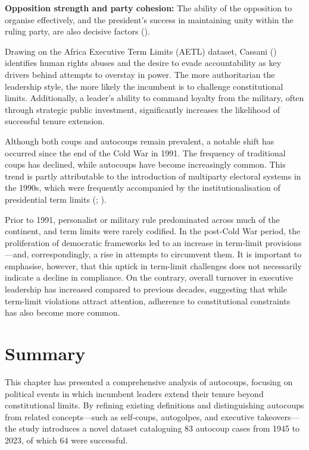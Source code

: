 \documentclass[
  12pt,
]{report}
\begin{document}
\textbf{Opposition strength and party cohesion:} The ability of the
opposition to organise effectively, and the president's success in
maintaining unity within the ruling party, are also decisive factors
().

Drawing on the Africa Executive Term Limits (AETL) dataset, Cassani
() identifies human rights abuses and
the desire to evade accountability as key drivers behind attempts to
overstay in power. The more authoritarian the leadership style, the more
likely the incumbent is to challenge constitutional limits.
Additionally, a leader's ability to command loyalty from the military,
often through strategic public investment, significantly increases the
likelihood of successful tenure extension.

Although both coups and autocoups remain prevalent, a notable shift has
occurred since the end of the Cold War in 1991. The frequency of
traditional coups has declined, while autocoups have become increasingly
common. This trend is partly attributable to the introduction of
multiparty electoral systems in the 1990s, which were frequently
accompanied by the institutionalisation of presidential term limits
(;
).

Prior to 1991, personalist or military rule predominated across much of
the continent, and term limits were rarely codified. In the post-Cold
War period, the proliferation of democratic frameworks led to an
increase in term-limit provisions---and, correspondingly, a rise in
attempts to circumvent them. It is important to emphasise, however, that
this uptick in term-limit challenges does not necessarily indicate a
decline in compliance. On the contrary, overall turnover in executive
leadership has increased compared to previous decades, suggesting that
while term-limit violations attract attention, adherence to
constitutional constraints has also become more common.

\section{Summary}\label{summary}

This chapter has presented a comprehensive analysis of autocoups,
focusing on political events in which incumbent leaders extend their
tenure beyond constitutional limits. By refining existing definitions
and distinguishing autocoups from related concepts---such as self-coups,
autogolpes, and executive takeovers---the study introduces a novel
dataset cataloguing 83 autocoup cases from 1945 to 2023, of which 64
were successful.
\end{document}
